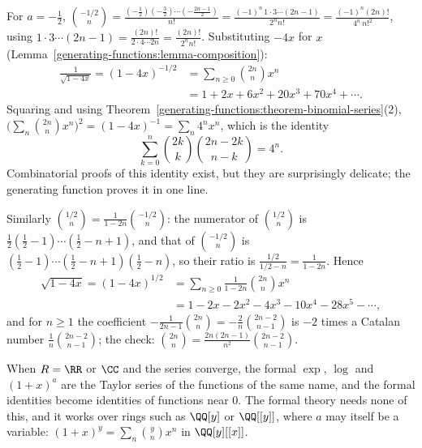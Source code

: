 \begin{example}\label{generating-functions:example-central-binomial}
For $a = -\frac12$, $\binom{-1/2}{n} = \frac{(-\frac12)(-\frac32) \cdots (-\frac{2n-1}{2})}{n!} = \frac{(-1)^n\,1 \cdot 3 \cdots (2n - 1)}{2^nn!} = \frac{(-1)^n(2n)!}{4^n\,n!^2}$, using
$1 \cdot 3 \cdots (2n - 1) = \frac{(2n)!}{2 \cdot 4 \cdots 2n} = \frac{(2n)!}{2^nn!}$. Substituting $-4x$ for $x$ (Lemma~\ref{generating-functions:lemma-composition}):
\[
\begin{aligned}
\frac{1}{\sqrt{1 - 4x}} = (1 - 4x)^{-1/2} &= \sum_{n \geq 0}\binom{2n}{n}x^n\\
&= 1 + 2x + 6x^2 + 20x^3 + 70x^4 + \cdots.
\end{aligned}
\]
Squaring and using Theorem~\ref{generating-functions:theorem-binomial-series}(2), $\bigl(\sum_n\binom{2n}{n}x^n\bigr)^2 = (1 - 4x)^{-1} = \sum_n4^nx^n$, which is the identity
\[
\sum_{k=0}^{n}\binom{2k}{k}\binom{2n - 2k}{n - k} = 4^n.
\]
Combinatorial proofs of this identity exist, but they are surprisingly delicate; the generating function proves it in one line.
\end{example}

\begin{example}\label{generating-functions:example-sqrt}
Similarly $\binom{1/2}{n} = \frac{1}{1 - 2n}\binom{-1/2}{n}$: the numerator of $\binom{1/2}{n}$ is $\frac12(\frac12 - 1) \cdots (\frac12 - n + 1)$, and that of $\binom{-1/2}{n}$ is
$(\frac12 - 1) \cdots (\frac12 - n + 1)(\frac12 - n)$, so their ratio is $\frac{1/2}{1/2 - n} = \frac{1}{1 - 2n}$. Hence
\[
\begin{aligned}
\sqrt{1 - 4x} = (1 - 4x)^{1/2} &= \sum_{n \geq 0}\frac{1}{1 - 2n}\binom{2n}{n}x^n\\
&= 1 - 2x - 2x^2 - 4x^3 - 10x^4 - 28x^5 - \cdots,
\end{aligned}
\]
and for $n \geq 1$ the coefficient $-\frac{1}{2n - 1}\binom{2n}{n} = -\frac{2}{n}\binom{2n - 2}{n - 1}$ is $-2$ times a Catalan number $\frac{1}{n}\binom{2n-2}{n-1}$; the check:
$\binom{2n}{n} = \frac{2n(2n - 1)}{n^2}\binom{2n - 2}{n - 1}$.
\end{example}

\begin{remark}\label{generating-functions:remark-formal-analytic}
When $R = \RR$ or $\CC$ and the series converge, the formal $\exp$, $\log$ and $(1 + x)^a$ are the Taylor series of the functions of the same name, and the formal identities become identities of
functions near $0$. The formal theory needs none of this, and it works over rings such as $\QQ[y]$ or $\QQ[[y]]$, where $a$ may itself be a variable: $(1 + x)^y = \sum_n\binom{y}{n}x^n$ in
$\QQ[y][[x]]$.
\end{remark}

